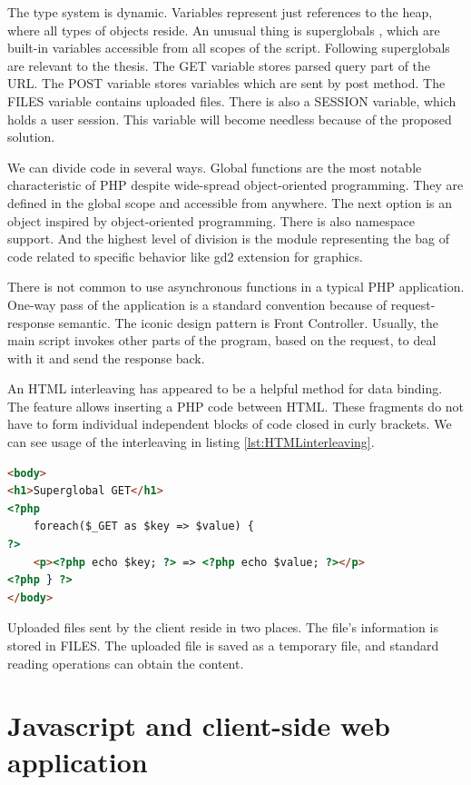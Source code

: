 The type system is dynamic.
Variables represent just references to the heap, where all types of objects reside.
An unusual thing is superglobals \cite{6}, which are built-in variables accessible from all scopes of the script.
Following superglobals are relevant to the thesis.
The GET variable stores parsed query part of the URL.
The POST variable stores variables which are sent by post method.
The FILES variable contains uploaded files.
There is also a SESSION variable, which holds a user session.
This variable will become needless because of the proposed solution.

We can divide code in several ways.
Global functions are the most notable characteristic of PHP despite wide-spread object-oriented programming.
They are defined in the global scope and accessible from anywhere.
The next option is an object inspired by object-oriented programming.
There is also namespace support.
And the highest level of division is the module representing the bag of code related to specific behavior like gd2 extension for graphics.

There is not common to use asynchronous functions in a typical PHP application.
One-way pass of the application is a standard convention because of request-response semantic.
The iconic design pattern is Front Controller.
Usually, the main script invokes other parts of the program, based on the request, to deal with it and send the response back.

An HTML interleaving has appeared to be a helpful method for data binding.
The feature allows inserting a PHP code between HTML.
These fragments do not have to form individual independent blocks of code closed in curly brackets. We can see usage of the interleaving in listing \ref{lst:HTMLinterleaving}.

\begin{lstlisting}[basicstyle=\small, caption=HTML interleaving.,
  language=HTML, label={lst:HTMLinterleaving}]
<body>
<h1>Superglobal GET</h1>
<?php
	foreach($_GET as $key => $value) {
?>
	<p><?php echo $key; ?> => <?php echo $value; ?></p>
<?php } ?>
</body>
\end{lstlisting}

Uploaded files sent by the client reside in two places.
The file's information is stored in FILES.
The uploaded file is saved as a temporary file, and standard reading operations can obtain the content.

\section{Javascript and client-side web application}

